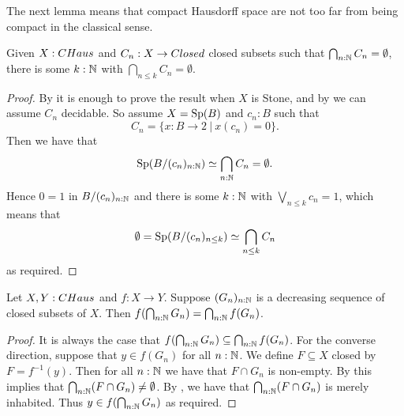 The next lemma means that compact Hausdorff space are not too far from being compact in the classical sense.

\begin{lemma}\label{CHausFiniteIntersectionProperty}
  Given $X:\Chaus$ and $C_n:X\to \Closed$ closed subsets such that $\bigcap_{n:\mathbb{N}} C_n =\emptyset$, there is some $k:\mathbb{N}$ 
  with $\bigcap_{n\leq k} C_n  = \emptyset$. 
\end{lemma}
\begin{proof}
  By  it is enough to prove the result when $X$ is Stone, and by  we can assume $C_n$ decidable.
  So assume 
  $X=\operatorname{Sp}(B)$ and $c_n:B$ such that
  \[C_n = \{x:B\to 2\ |\ x(c_n) = 0\}.\]
  Then we have that
  \[\Sp(B/(c_n)_{n:\N})%
  \simeq \bigcap_{n:\N} C_n = \emptyset .\]
  Hence 
  $0=1$ in $B/(c_n)_{n:\mathbb{N}}$ %
  and there is some $k:\mathbb{N}$ with 
  $\bigvee_{n\leq k} c_n = 1$, which means that
  \[\emptyset = \Sp(B/(c_n)_{n\leq k}) %
  \simeq \bigcap_{n\leq k} C_n \]
  as required.
\end{proof}

\begin{corollary}\label{ChausMapsPreserveIntersectionOfClosed}
  Let $X,Y:\CHaus$ and $f:X \to Y$. 
  Suppose $(G_n)_{n:\mathbb{N}}$ is a decreasing sequence of closed subsets of $X$. 
  Then $f(\bigcap_{n:\mathbb{N}} G_n) = \bigcap_{n:\mathbb{N}}f(G_n)$. 
\end{corollary}
\begin{proof}
  It is always the case that $f(\bigcap_{n:\mathbb{N}} G_n) \subseteq \bigcap_{n:\mathbb{N}} f(G_n)$. 
  For the converse direction, suppose that $y \in f(G_n)$ for all $n:\mathbb{N}$. 
  We define $F\subseteq X$ closed by $F=f^{-1}(y)$. 
  Then for all $n:\mathbb{N}$ we have that $F\cap G_n$ is %
  non-empty. 
  By  this implies that $\bigcap_{n:\mathbb{N}}(F\cap G_n) \neq \emptyset$. 
  By ,  we have that %
  $\bigcap_{n:\mathbb{N}} (F\cap G_n)$ is merely inhabited. Thus $y\in f(\bigcap_{n:\mathbb{N}} G_n)$ as required. 
\end{proof}

